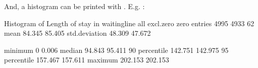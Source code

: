 \documentclass[letterpaper,10pt,english]{sphinxmanual}
\begin{document}
And, a histogram can be printed with . E.g.
:

\begin{sphinxVerbatim}[commandchars=\\\{\}]
Histogram of Length of stay in waitingline
                        all    excl.zero         zero
\PYGZhy{}\PYGZhy{}\PYGZhy{}\PYGZhy{}\PYGZhy{}\PYGZhy{}\PYGZhy{}\PYGZhy{}\PYGZhy{}\PYGZhy{}\PYGZhy{}\PYGZhy{}\PYGZhy{}\PYGZhy{} \PYGZhy{}\PYGZhy{}\PYGZhy{}\PYGZhy{}\PYGZhy{}\PYGZhy{}\PYGZhy{}\PYGZhy{}\PYGZhy{}\PYGZhy{}\PYGZhy{}\PYGZhy{} \PYGZhy{}\PYGZhy{}\PYGZhy{}\PYGZhy{}\PYGZhy{}\PYGZhy{}\PYGZhy{}\PYGZhy{}\PYGZhy{}\PYGZhy{}\PYGZhy{}\PYGZhy{} \PYGZhy{}\PYGZhy{}\PYGZhy{}\PYGZhy{}\PYGZhy{}\PYGZhy{}\PYGZhy{}\PYGZhy{}\PYGZhy{}\PYGZhy{}\PYGZhy{}\PYGZhy{}
entries            4995         4933           62
mean                 84.345       85.405
std.deviation        48.309       47.672

minimum               0            0.006
median               94.843       95.411
90\PYGZpc{} percentile      142.751      142.975
95\PYGZpc{} percentile      157.467      157.611
maximum             202.153      202.153


\end{sphinxVerbatim}
\end{document}
